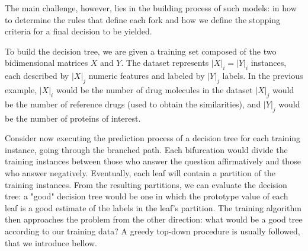
The main challenge, however, lies in the building process of such models: in how to determine the rules that define each fork and how we define the stopping criteria for a final decision to be yielded.

To build the decision tree, we are given a training set composed of the two bidimensional matrices $X$ and $Y$. The dataset represents $|X|_i = |Y|_i$ instances, each described by $|X|_j$ numeric features and labeled by $|Y|_j$ labels.
In the previous example, $|X|_i$ would be the number of drug molecules in the dataset
$|X|_j$ would be the number of reference drugs (used to obtain the similarities), and $|Y|_j$ would be the number of proteins of interest.



Consider now executing the prediction process of a decision tree for each training instance, going through the branched path. Each bifurcation would divide the training instances between those who answer the question affirmatively and those who answer negatively. Eventually, each leaf will contain a partition of the training instances.
From the resulting partitions, we can evaluate the decision tree:
a "good" decision tree would be one in which the prototype value of each leaf is a good estimate of the labels in the leaf's partition.
%
The training algorithm then approaches the problem from the other direction: what would be a good tree according to our training data?
A greedy top-down procedure is usually followed, that we introduce bellow.

